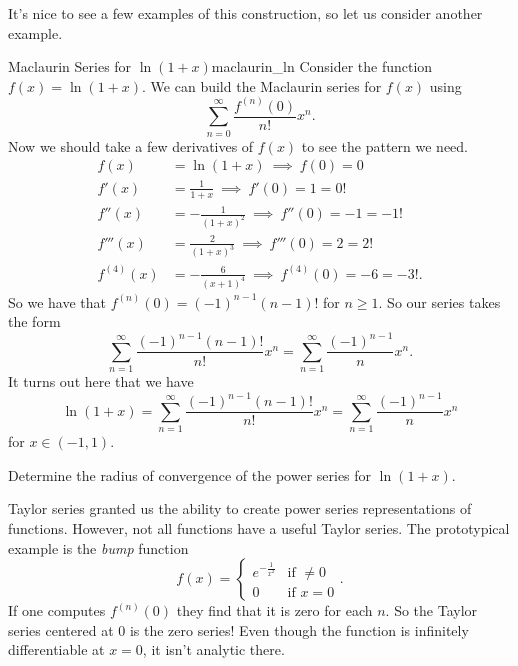 It's nice to see a few examples of this construction, so let us consider another example.

\begin{ex}{Maclaurin Series for $\ln(1+x)$}{maclaurin_ln}
Consider the function $f(x)=\ln(1+x)$.  We can build the Maclaurin series for $f(x)$ using
\[
\sum_{n=0}^\infty \frac{f^{(n)}(0)}{n!}x^n.
\]
Now we should take a few derivatives of $f(x)$ to see the pattern we need.
\begin{align*}
    f(x)&= \ln(1+x) ~\implies~ f(0)=0\\
    f'(x)&=\frac{1}{1+x} ~\implies~ f'(0)=1=0!\\
    f''(x)&= -\frac{1}{(1+x)^2} ~\implies~ f''(0)=-1=-1!\\
    f'''(x)&= \frac{2}{(1+x)^3} ~\implies~ f'''(0)=2=2!\\
    f^{(4)}(x)&= -\frac{6}{(x+1)^4} ~\implies~ f^{(4)}(0)=-6=-3!.
\end{align*}
So we have that $f^{(n)}(0)=(-1)^{n-1}(n-1)!$ for $n\geq 1$. So our series takes the form
\[
\sum_{n=1}^\infty \frac{(-1)^{n-1}(n-1)!}{n!}x^n = \sum_{n=1}^\infty \frac{(-1)^{n-1}}{n}x^n.
\]
It turns out here that we have 
\[
\ln(1+x)=\sum_{n=1}^\infty \frac{(-1)^{n-1}(n-1)!}{n!}x^n = \sum_{n=1}^\infty \frac{(-1)^{n-1}}{n}x^n
\]
for $x\in (-1,1)$.  
\end{ex}

\begin{exercise}
Determine the radius of convergence of the power series for $\ln(1+x)$.
\end{exercise}

Taylor series granted us the ability to create power series representations of functions.  However, not all functions have a useful Taylor series.  The prototypical example is the \emph{bump} function
\[
f(x) = \begin{cases} e^{-\frac{1}{x^2}} & \textrm{if $\neq 0$}\\ 0 & \textrm{if $x=0$} \end{cases}.
\]
If one computes $f^{(n)}(0)$ they find that it is zero for each $n$. So the Taylor series centered at $0$ is the zero series! Even though the function is infinitely differentiable at $x=0$, it isn't analytic there.

